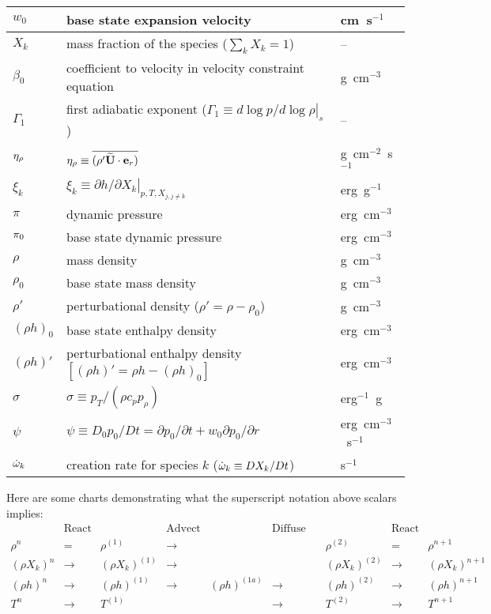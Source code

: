 \begin{center}
\begin{longtable}{|l|p{4.0in}|l|}
\hline
$w_0$   & base state expansion velocity              & cm~s$^{-1}$ \\
\hline
$X_k$   & mass fraction of the species ($\sum_k X_k = 1$) & -- \\
\hline
$\beta_0$ & coefficient to velocity
            in velocity constraint equation  & g~cm$^{-3}$ \\
\hline
$\Gamma_1$ & first adiabatic exponent ($\Gamma_1 \equiv \left . d \log p/d \log \rho \right |_s$) & -- \\
\hline
$\eta_{\rho}$ & $\eta_{\rho} \equiv \overline{(\rho' \widetilde{{\bf U}} \cdot \mathbf{e}_r)}$ & g~cm$^{-2}$~s$^{-1}$ \\
\hline
$\xi_k$ & $\xi_k \equiv \left . \partial h / \partial X_k \right |_{p,T,X_{j,j\ne k}}$ & erg~g$^{-1}$ \\
\hline 
$\pi$   & dynamic pressure & erg~cm$^{-3}$ \\
\hline
$\pi_0$ & base state dynamic pressure & erg~cm$^{-3}$ \\
\hline
$\rho$  & mass density  & g~cm$^{-3}$ \\
\hline
$\rho_0$  & base state mass density  & g~cm$^{-3}$ \\
\hline
$\rho'$  & perturbational density ($\rho' = \rho - \rho_0$) & g~cm$^{-3}$ \\
\hline
$(\rho h)_0$ & base state enthalpy density & erg~cm$^{-3}$  \\
\hline
$(\rho h)'$ & perturbational enthalpy density 
              $ \left [(\rho h)' = \rho h - (\rho h)_0 \right ]$ & erg~cm$^{-3}$  \\
\hline
$\sigma$ & $\sigma \equiv p_T/(\rho c_p p_\rho)$ & erg$^{-1}$~g \\
\hline
$\psi$  & $\psi \equiv D_0 p_0/Dt = \partial p_0/\partial t + w_0\partial p_0/\partial r$ & erg~cm$^{-3}$~s$^{-1}$ \\
\hline
$\dot{\omega}_k$ & creation rate for species $k$ ($\dot{\omega}_k \equiv DX_k/Dt$) & s$^{-1}$ \\
\end{longtable}
\end{center}
%
\renewcommand{\arraystretch}{1.0}
Here are some charts demonstrating what the superscript notation above scalars implies:
\begin{equation}
\left.\begin{array}{ccccccccc}
& \text{React State} & & \text{Advect State} & & \text{Diffuse Enthalpy} & & \text{React State} & \\
\rho^n & = & \rho^{(1)} & \longrightarrow & & & \rho^{(2)} & = & \rho^{n+1} \\
(\rho X_k)^n & \longrightarrow & (\rho X_k)^{(1)} & \longrightarrow & & & (\rho X_k)^{(2)} & \longrightarrow & (\rho X_k)^{n+1} \\
(\rho h)^n & \longrightarrow & (\rho h)^{(1)} & \longrightarrow & (\rho h)^{(1a)} & \longrightarrow & (\rho h)^{(2)} & \longrightarrow & (\rho h)^{n+1}\\
T^n & \longrightarrow & T^{(1)} & & & \longrightarrow & T^{(2)} & \longrightarrow & T^{n+1} \\
\end{array}\right.\nonumber
\end{equation}
